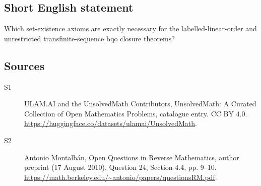 \documentclass[11pt]{article}
\begin{document}
\subsection{Short English statement}
Which set-existence axioms are exactly necessary for the labelled-linear-order and unrestricted transfinite-sequence bqo closure theorems?
\subsection{Sources}
\begin{description}
\item[\hypertarget{source:statement:1}{S1}] ULAM.AI and the UnsolvedMath Contributors, UnsolvedMath: A Curated Collection of Open Mathematics Problems, catalogue entry. CC BY 4.0. \url{https://huggingface.co/datasets/ulamai/UnsolvedMath}.
\item[\hypertarget{source:statement:2}{S2}] Antonio Montalbán, Open Questions in Reverse Mathematics, author preprint (17 August 2010), Question 24, Section 4.4, pp. 9--10. \url{https://math.berkeley.edu/~antonio/papers/questionsRM.pdf}.
\end{description}
\label{end:statement}
\end{document}

